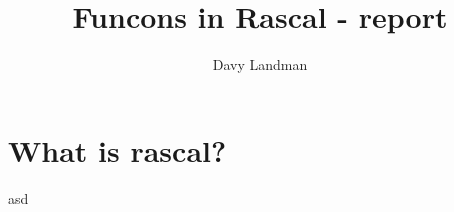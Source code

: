 \documentclass[a4paper, 10pt, oneside, notitlepage]{article}
\title{Funcons in Rascal - report}
\author{Davy Landman}
\begin{document}
\maketitle

\section{What is rascal?}

asd
\end{document}
